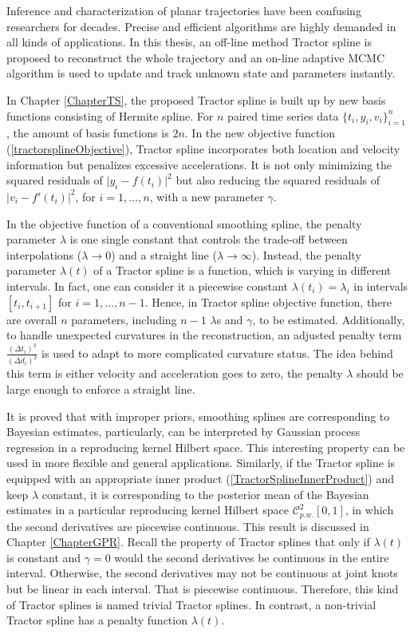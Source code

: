 

Inference and characterization of planar trajectories have been confusing researchers for decades. Precise and efficient algorithms are highly demanded in all kinds of applications. In this thesis, an off-line method Tractor spline is proposed to reconstruct the whole trajectory and an on-line adaptive MCMC algorithm is used to update and track unknown state and parameters instantly. 


In Chapter \ref{ChapterTS}, the proposed Tractor spline is built up by new basis functions consisting of Hermite spline. For $n$ paired time series data $\{t_i,y_i,v_i\}_{i=1}^{n}$, the amount of basis functions is $2n$. In the new objective function (\ref{tractorsplineObjective}), Tractor spline incorporates both location and velocity information but penalizes excessive accelerations. It is not only minimizing the squared residuals of $\lvert y_i-f(t_i)\rvert^2$ but also reducing the squared residuals of $\lvert v_i-f'(t_i)\rvert^2$, for $i=1,\ldots,n$, with a new parameter $\gamma$. 

In the objective function of a conventional smoothing spline, the penalty parameter $\lambda$ is one single constant that controls the trade-off between interpolations ($\lambda\to 0$) and a straight line ($\lambda\to \infty$). Instead, the penalty parameter $\lambda(t)$ of a Tractor spline is a function, which is varying in different intervals. In fact, one can consider it a piecewise constant $\lambda(t_i)=\lambda_i$ in intervals $[t_i,t_{i+1}]$ for $i=1,\ldots,n-1$. Hence, in Tractor spline objective function, there are overall $n$ parameters, including $n-1$ $\lambda$s and $\gamma$, to be estimated. Additionally, to handle unexpected curvatures in the reconstruction, an adjusted penalty term $\frac{(\Delta t_i)^3}{(\Delta d_i)^2}$ is used to adapt to more complicated curvature status. The idea behind this term is either velocity and acceleration goes to zero, the penalty $\lambda$ should be large enough to enforce a straight line. 





It is proved that with improper priors, smoothing splines are corresponding to Bayesian estimates, particularly, can be interpreted by Gaussian process regression in a reproducing kernel Hilbert space. This interesting property can be used in more flexible and general applications. Similarly, if the Tractor spline is equipped with an appropriate inner product (\ref{TractorSplineInnerProduct}) and keep $\lambda$ constant, it is corresponding to the posterior mean of the Bayesian estimates in a particular reproducing kernel Hilbert space $\mathcal{C}_{p.w.}^2[0,1]$, in which the second derivatives are piecewise continuous. This result is discussed in Chapter \ref{ChapterGPR}. Recall the property of Tractor splines that only if $\lambda(t)$ is constant and $\gamma=0$ would the second derivatives be continuous in the entire interval. Otherwise, the second derivatives may not be continuous at joint knots but be linear in each interval. That is piecewise continuous. Therefore, this kind of Tractor splines is named trivial Tractor splines. In contrast, a non-trivial Tractor spline has a penalty function $\lambda(t)$. 


